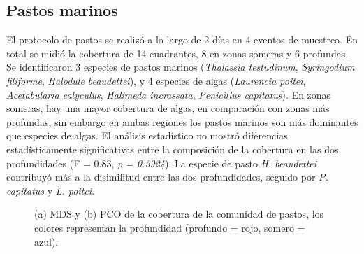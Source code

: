 \documentclass[
  authoryear,
  preprint,
  3p,
  twocolumn]{elsarticle}
\begin{document}
\subsection{Pastos marinos}\label{pastos-marinos-1}

El protocolo de pastos se realizó a lo largo de 2 días en 4 eventos de
muestreo. En total se midió la cobertura de 14 cuadrantes, 8 en zonas
someras y 6 profundas. Se identificaron 3 especies de pastos marinos
(\emph{Thalassia testudinum}, \emph{Syringodium filiforme},
\emph{Halodule beaudettei}), y 4 especies de algas (\emph{Laurencia
poitei}, \emph{Acetabularia calyculus}, \emph{Halimeda incrassata},
\emph{Penicillus capitatus}). En zonas someras, hay una mayor cobertura
de algas, en comparación con zonas más profundas, sin embargo en ambas
regiones los pastos marinos son más dominantes que especies de algas. El
análisis estadístico no mostró diferencias estadísticamente
significativas entre la composición de la cobertura en las dos
profundidades (F = 0.83, \emph{p = 0.3924}). La especie de pasto
\emph{H. beaudettei} contribuyó más a la disimilitud entre las dos
profundidades, seguido por \emph{P. capitatus} y \emph{L. poitei}.

\begin{figure}


\caption{\label{fig-1}(a) MDS y (b) PCO de la cobertura de la comunidad
de pastos, los colores representan la profundidad (profundo = rojo,
somero = azul).}

\end{figure}%
\end{document}
